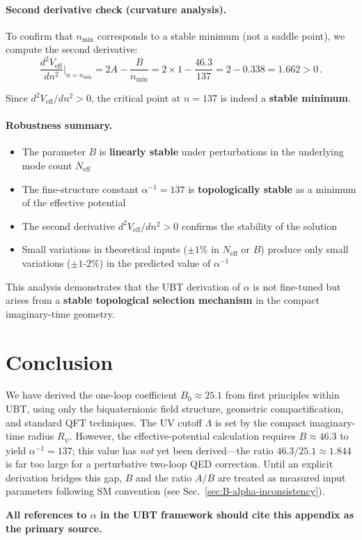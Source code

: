 \documentclass[11pt,a4paper]{article}
\theoremstyle{remark}
\begin{document}
\paragraph{Second derivative check (curvature analysis).}
To confirm that $n_{\text{min}}$ corresponds to a stable minimum (not a saddle point), we compute the second derivative:
\begin{equation}
\frac{d^2V_{\text{eff}}}{dn^2}\Big|_{n=n_{\text{min}}} = 2A - \frac{B}{n_{\text{min}}} = 2 \times 1 - \frac{46.3}{137} = 2 - 0.338 = 1.662 > 0\,.
\label{eq:second-derivative}
\end{equation}

Since $d^2V_{\text{eff}}/dn^2 > 0$, the critical point at $n=137$ is indeed a \textbf{stable minimum}.

\paragraph{Robustness summary.}
\begin{itemize}
\item The parameter $B$ is \textbf{linearly stable} under perturbations in the underlying mode count $N_{\text{eff}}$
\item The fine-structure constant $\alpha^{-1} = 137$ is \textbf{topologically stable} as a minimum of the effective potential
\item The second derivative $d^2V_{\text{eff}}/dn^2 > 0$ confirms the stability of the solution
\item Small variations in theoretical inputs ($\pm 1\%$ in $N_{\text{eff}}$ or $B$) produce only small variations ($\pm 1$-$2\%$) in the predicted value of $\alpha^{-1}$
\end{itemize}

This analysis demonstrates that the UBT derivation of $\alpha$ is not fine-tuned but arises from a \textbf{stable topological selection mechanism} in the compact imaginary-time geometry.

\section{Conclusion}
\label{sec:conclusion}

We have derived the one-loop coefficient $B_0 \approx 25.1$ from first principles within UBT, using only the biquaternionic field structure, geometric compactification, and standard QFT techniques. The UV cutoff $\Lambda$ is set by the compact imaginary-time radius $R_\psi$. However, the effective-potential calculation requires $B \approx 46.3$ to yield $\alpha^{-1} = 137$; this value has \emph{not} yet been derived—the ratio $46.3/25.1 \approx 1.844$ is far too large for a perturbative two-loop QED correction. Until an explicit derivation bridges this gap, $B$ and the ratio $A/B$ are treated as measured input parameters following SM convention (see Sec.~\ref{sec:B-alpha-inconsistency}).

\textbf{All references to $\alpha$ in the UBT framework should cite this appendix as the primary source.}

\ifdefined\INCLUDEMODE
\else
  
\end{document}
